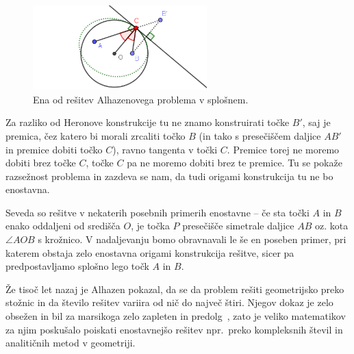 \begin{figure}[h]
    \centering
    \includegraphics[width=0.6\textwidth]{images/alhazen/alhazen1.png}
    \caption[Alhazenov problem]{Ena od rešitev Alhazenovega problema v splošnem.}
    \label{fig:alhazen1}
\end{figure}

Za razliko od Heronove konstrukcije tu ne znamo konstruirati točke $B'$, saj je premica, čez katero bi morali zrcaliti točko $B$ (in tako s presečiščem daljice $AB'$ in premice dobiti točko $C$), ravno tangenta v točki $C$. Premice torej ne moremo dobiti brez točke $C$, točke $C$ pa ne moremo dobiti brez te premice. Tu se pokaže razsežnost problema in zazdeva se nam, da tudi origami konstrukcija tu ne bo enostavna.

Seveda so rešitve v nekaterih posebnih primerih enostavne -- če sta točki $A$ in $B$ enako oddaljeni od središča $O$, je točka $P$ presečišče simetrale daljice $AB$ oz. kota $\angle AOB$ s krožnico. V nadaljevanju bomo obravnavali le še en poseben primer, pri katerem obstaja zelo enostavna origami konstrukcija rešitve, sicer pa predpostavljamo splošno lego točk $A$ in $B$.


Že tisoč let nazaj je Alhazen pokazal, da se da problem rešiti geometrijsko preko stožnic in da število rešitev variira od nič do največ štiri. Njegov dokaz je zelo obsežen in bil za marsikoga zelo zapleten in predolg~\cite{wilk2015}, zato je veliko matematikov za njim poskušalo poiskati enostavnejšo rešitev npr.\ preko kompleksnih števil in analitičnih metod v geometriji.

